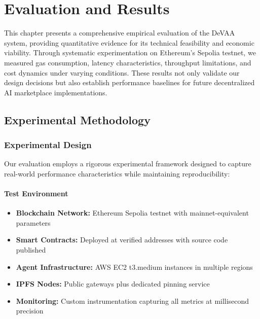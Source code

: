 \chapter{Evaluation and Results}
\label{chap:evaluation_results}

This chapter presents a comprehensive empirical evaluation of the DeVAA system, providing quantitative evidence for its technical feasibility and economic viability. Through systematic experimentation on Ethereum's Sepolia testnet, we measured gas consumption, latency characteristics, throughput limitations, and cost dynamics under varying conditions. These results not only validate our design decisions but also establish performance baselines for future decentralized AI marketplace implementations.

\section{Experimental Methodology}

\subsection{Experimental Design}

Our evaluation employs a rigorous experimental framework designed to capture real-world performance characteristics while maintaining reproducibility:

\subsubsection{Test Environment}
\begin{itemize}
    \item \textbf{Blockchain Network:} Ethereum Sepolia testnet with mainnet-equivalent parameters
    \item \textbf{Smart Contracts:} Deployed at verified addresses with source code published
    \item \textbf{Agent Infrastructure:} AWS EC2 t3.medium instances in multiple regions
    \item \textbf{IPFS Nodes:} Public gateways plus dedicated pinning service
    \item \textbf{Monitoring:} Custom instrumentation capturing all metrics at millisecond precision
\end{itemize}

